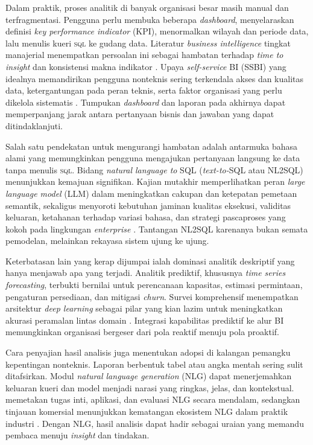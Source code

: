 \documentclass[12pt,a4paper,oneside]{book}
\begin{document}
Dalam praktik, proses analitik di banyak organisasi besar masih manual dan terfragmentasi. Pengguna perlu membuka beberapa \textit{dashboard}, menyelaraskan definisi \textit{key performance indicator} (KPI), menormalkan wilayah dan periode data, lalu menulis kueri \textsc{sql} ke gudang data. Literatur \textit{business intelligence} tingkat manajerial menempatkan persoalan ini sebagai hambatan terhadap \textit{time to insight} dan konsistensi makna indikator \parencite{Sharda2020}. Upaya \textit{self-service} BI (SSBI) yang idealnya memandirikan pengguna nonteknis sering terkendala akses dan kualitas data, ketergantungan pada peran teknis, serta faktor organisasi yang perlu dikelola sistematis \parencite{Lennerholt2021,Lennerholt2023}. Tumpukan \textit{dashboard} dan laporan pada akhirnya dapat memperpanjang jarak antara pertanyaan bisnis dan jawaban yang dapat ditindaklanjuti.

Salah satu pendekatan untuk mengurangi hambatan adalah antarmuka bahasa alami yang memungkinkan pengguna mengajukan pertanyaan langsung ke data tanpa menulis \textsc{sql}. Bidang \textit{natural language to} SQL (\textit{text-to-}SQL atau NL2SQL) menunjukkan kemajuan signifikan. Kajian mutakhir memperlihatkan peran \textit{large language model} (LLM) dalam meningkatkan cakupan dan ketepatan pemetaan semantik, sekaligus menyoroti kebutuhan jaminan kualitas eksekusi, validitas keluaran, ketahanan terhadap variasi bahasa, dan strategi pascaproses yang kokoh pada lingkungan \textit{enterprise} \parencite{Gao2023,Li2024}. Tantangan NL2SQL karenanya bukan semata pemodelan, melainkan rekayasa sistem ujung ke ujung.

Keterbatasan lain yang kerap dijumpai ialah dominasi analitik deskriptif yang hanya menjawab apa yang terjadi. Analitik prediktif, khususnya \textit{time series forecasting}, terbukti bernilai untuk perencanaan kapasitas, estimasi permintaan, pengaturan persediaan, dan mitigasi \textit{churn}. Survei komprehensif menempatkan arsitektur \textit{deep learning} sebagai pilar yang kian lazim untuk meningkatkan akurasi peramalan lintas domain \parencite{Lim2021,Benidis2020}. Integrasi kapabilitas prediktif ke alur BI memungkinkan organisasi bergeser dari pola reaktif menuju pola proaktif.

Cara penyajian hasil analisis juga menentukan adopsi di kalangan pemangku kepentingan nonteknis. Laporan berbentuk tabel atau angka mentah sering sulit ditafsirkan. Modul \textit{natural language generation} (NLG) dapat menerjemahkan keluaran kueri dan model menjadi narasi yang ringkas, jelas, dan kontekstual. \parencite{Gatt2018} memetakan tugas inti, aplikasi, dan evaluasi NLG secara mendalam, sedangkan tinjauan komersial menunjukkan kematangan ekosistem NLG dalam praktik industri \parencite{Dale2020}. Dengan NLG, hasil analisis dapat hadir sebagai uraian yang memandu pembaca menuju \textit{insight} dan tindakan.
\end{document}
